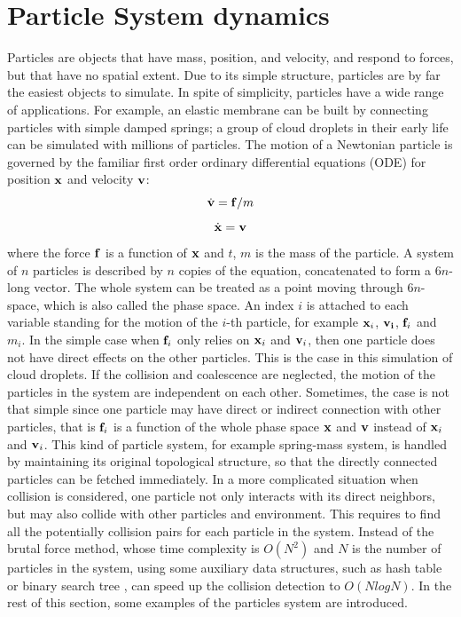 \section{Particle System dynamics}
Particles are objects that have mass, position, and velocity, and respond to forces, but that have no spatial extent. Due to its simple structure, particles are by far the easiest objects to simulate. In spite of simplicity, particles have a wide range of applications. For example, an elastic membrane can be built by connecting particles with simple damped springs; a group of cloud droplets in their early life can be simulated with millions of particles. The motion of a Newtonian particle is governed by the familiar first order ordinary differential equations (ODE) for position $\mathbf{x}$ and velocity $\mathbf{v}$:
\begin{equation}
\dot{\mathbf{v}} = \mathbf{f}/m
\label{dv_eqn}
\end{equation}
\begin{equation}
\dot{\mathbf{x}} = \mathbf{v}
\label{dx_eqn}
\end{equation}
where the force $\mathbf{f}$ is a function of $\mathbf{x}$ and $t$, $m$ is the mass of the particle. A system of $n$ particles is described by $n$ copies of the equation, concatenated to form a $6n$-long vector. The whole system can be treated as a point moving through $6n$-space, which is also called the phase space. An index $i$ is attached to each variable standing for the motion of the $i$-th particle, for example $\mathbf{x}_i$, $\mathbf{v_i}$, $\mathbf{f}_i$ and $m_i$. In the simple case when $\mathbf{f}_i$ only relies on $\mathbf{x}_i$ and $\mathbf{v}_i$, then one particle does not have direct effects on the other particles. This is the case in this simulation of cloud droplets. If the collision and coalescence are neglected, the motion of the particles in the system are independent on each other. Sometimes, the case is not that simple since one particle may have direct or indirect connection with other particles, that is $\mathbf{f}_i$ is a function of the whole phase space $\mathbf{x}$ and $\mathbf{v}$ instead of $\mathbf{x}_i$ and $\mathbf{v}_i$. This kind of particle system, for example spring-mass system, is handled by maintaining its original topological structure, so that the directly connected particles can be fetched immediately. In a more complicated situation when collision is considered, one particle not only interacts with its direct neighbors, but may also collide with other particles and environment. This requires to find all the potentially collision pairs for each particle in the system. Instead of the brutal force method, whose time complexity is $O(N^2)$ and $N$ is the number of particles in the system, using some auxiliary data structures, such as hash table \cite{} or binary search tree \cite{}, can speed up the collision detection to $O(NlogN)$. In the rest of this section, some examples of the particles system are introduced.

